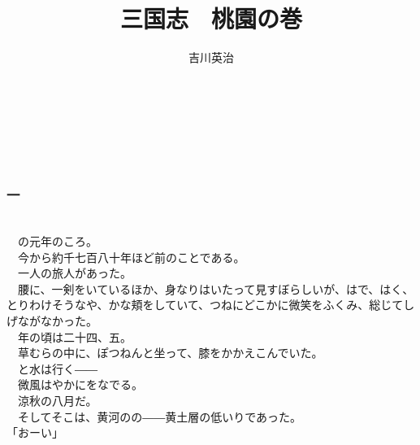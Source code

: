 \documentclass[
  paper=a5,
  fontsize=10pt,
  jafontsize=9.5pt,
  tate,                  %
  open_bracket_pos=nibu, %
]{jlreq}
\title{三国志　桃園の巻}
\author{吉川英治}
\date{}
\begin{document}
\maketitle

\\

\subsection{}

\\

\subsubsection{一}

\\


　の元年のころ。\\


　今から約千七百八十年ほど前のことである。\\


　一人の旅人があった。\\


　腰に、一剣をいているほか、身なりはいたって見すぼらしいが、はで、はく、とりわけそうなや、かな頬をしていて、つねにどこかに微笑をふくみ、総じてしげながなかった。\\


　年の頃は二十四、五。\\


　草むらの中に、ぽつねんと坐って、膝をかかえこんでいた。\\


　と水は行く――\\


　微風はやかにをなでる。\\


　涼秋の八月だ。\\


　そしてそこは、黄河のの――黄土層の低いりであった。\\


「おーい」\\
\end{document}
